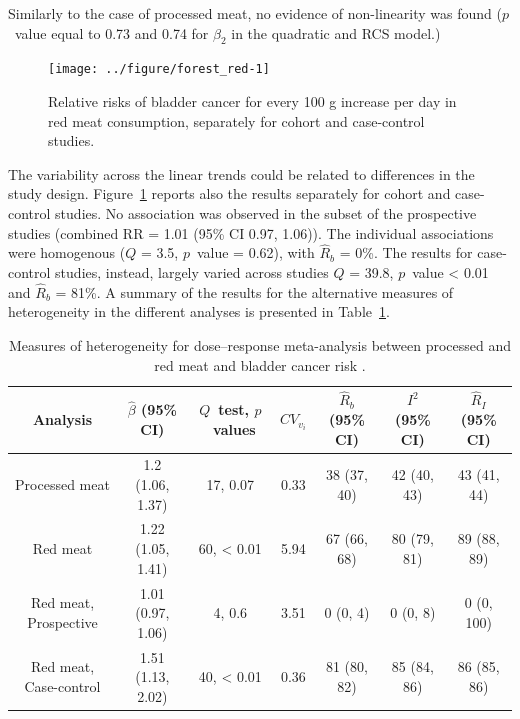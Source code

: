 \documentclass[11pt,a4paper,twoside,openany]{book}\usepackage{knitr}
\begin{document}
{{\noindent Similarly to the case of processed meat, no evidence of non-linearity was found ($p$~value equal to 0.73 and 0.74 for $\beta_2$ in the quadratic and RCS model.)

\begin{knitrout}\footnotesize
{}\color{fgcolor}\begin{figure}[ht!]

{\centering \texttt{[image: ../figure/forest\_red-1]} 

}

\caption[Relative risks of bladder cancer for every 100 g increase per day in red meat consumption, separately for cohort and case-control studies]{Relative risks of bladder cancer for every 100 g increase per day in red meat consumption, separately for cohort and case-control studies.}\label{fig:forest_red}
\end{figure}


\end{knitrout}

The variability across the linear trends could be related to differences in the study design. Figure~\ref{fig:forest_red} reports also the results separately for cohort and case-control studies. No association was observed in the subset of the prospective studies (combined RR = 1.01 (95\% CI 0.97, 1.06)). The individual associations were homogenous ($Q $ = 3.5, $p$~value = 0.62), with $\hat R_b$ = 0\%. The results for case-control studies, instead, largely varied across studies $Q $ = 39.8, $p$~value < 0.01 and $\hat R_b$ = 81\%. A summary of the results for the alternative measures of heterogeneity in the different analyses is presented in Table~\ref{tab:tab_rb}.

\begin{table}[!h]

\caption{\label{tab:tab_rb}Measures of heterogeneity for dose--response meta-analysis between processed and red meat and bladder cancer risk \citep{crippa2016red}.}
\centering
\fontsize{8.5}{10.5}\selectfont
\begin{tabular}[t]{ccccccc}
\toprule
Analysis & $\hat \beta$ (95\% CI) & $Q$~test, $p$~values & $CV_{v_i}$ & $\hat R_b$ (95\% CI) & $I^2$ (95\% CI) & $\hat R_I$ (95\% CI)\\
\midrule
Processed meat & 1.2 (1.06, 1.37) & 17, 0.07 & 0.33 & 38 (37, 40) & 42 (40, 43) & 43 (41, 44)\\
Red meat & 1.22 (1.05, 1.41) & 60, < 0.01 & 5.94 & 67 (66, 68) & 80 (79, 81) & 89 (88, 89)\\
Red meat, Prospective & 1.01 (0.97, 1.06) & 4, 0.6 & 3.51 & 0 (0, 4) & 0 (0, 8) & 0 (0, 100)\\
Red meat, Case-control & 1.51 (1.13, 2.02) & 40, < 0.01 & 0.36 & 81 (80, 82) & 85 (84, 86) & 86 (85, 86)\\
\bottomrule
\end{tabular}
\end{table}










}}
\end{document}
